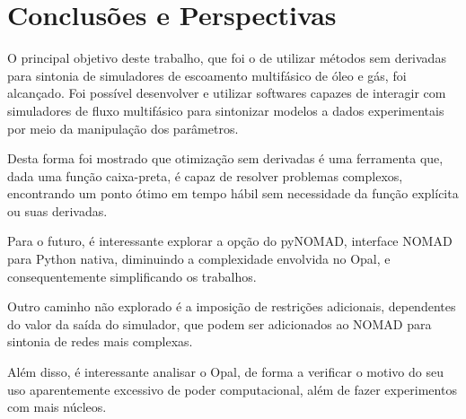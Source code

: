 \chapter{Conclusões e Perspectivas}
%
O principal objetivo deste trabalho, que foi o de utilizar métodos sem derivadas para sintonia de simuladores de escoamento multifásico de óleo e gás, foi alcançado.
%
Foi possível desenvolver e utilizar softwares capazes de interagir com simuladores de fluxo multifásico para sintonizar modelos a dados experimentais por meio da manipulação dos parâmetros.
%

Desta forma foi mostrado que otimização sem derivadas é uma ferramenta que, dada uma função caixa-preta, é capaz de resolver problemas complexos, encontrando um ponto ótimo em tempo hábil sem necessidade da função explícita ou suas derivadas.
%

Para o futuro, é interessante explorar a opção do pyNOMAD, interface NOMAD para Python nativa, diminuindo a complexidade envolvida no Opal, e consequentemente simplificando os trabalhos.
%

Outro caminho não explorado é a imposição de restrições adicionais, dependentes do valor da saída do simulador, que podem ser adicionados ao NOMAD para sintonia de redes mais complexas.
%

Além disso, é interessante analisar o Opal, de forma a verificar o motivo do seu uso aparentemente excessivo de poder computacional, além de fazer experimentos com mais núcleos.
%
